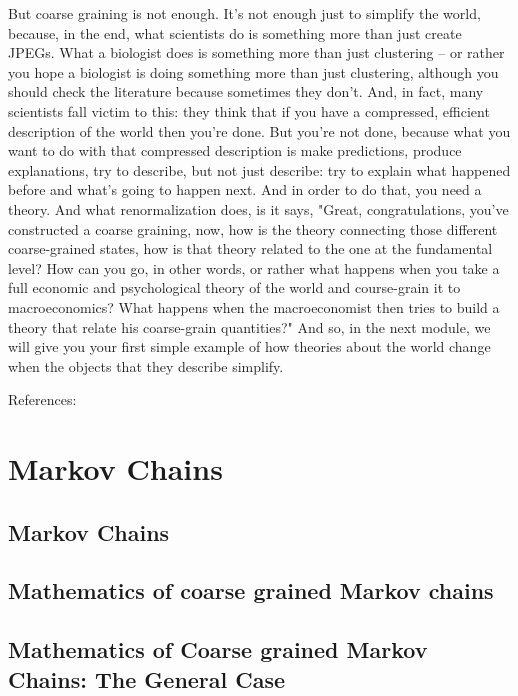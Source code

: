 \documentclass[]{article}
\begin{document}
But coarse graining is not enough.
It's not enough
just to simplify the world,
because, in the end, what scientists do
is something more than just create JPEGs.
What a biologist does
is something more than just clustering –
or rather you hope a biologist is doing
something more than just clustering,
although you should check the literature
because sometimes they don't.
And, in fact, many scientists
fall victim to this:
they think that if you have a compressed,
efficient description of the world
then you're done.
But you're not done,
because what you want to do
with that compressed description
is make predictions, produce explanations,
try to describe, but not just describe:
try to explain what happened before
and what's going to happen next.
And in order to do that,
you need a theory.
And what renormalization does,
is it says,
"Great, congratulations,
you've constructed a coarse graining,
now, how is the theory connecting
those different coarse-grained states,
how is that theory related
to the one at the fundamental level?
How can you go, in other words,
or rather what happens when you take
a full economic
and psychological theory of the world
and course-grain it to macroeconomics?
What happens when the macroeconomist
then tries to build a theory
that relate his coarse-grain quantities?"
And so, in the next module,
we will give you your first simple example
of how theories about the world change
when the objects
that they describe simplify.

References: \cite{dedeo2018information,dedeo2013bootstrap,dedeo201716}

\section{Markov Chains}

\subsection{Markov Chains}

\subsection{Mathematics of coarse grained Markov chains}

\subsection{Mathematics of Coarse grained Markov Chains: The General Case }
\end{document}
